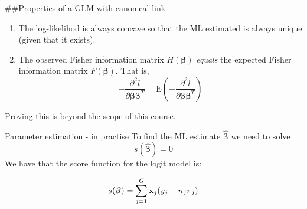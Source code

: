 \documentclass[
  ignorenonframetext,
]{beamer}
\begin{document}
\begin{frame}
\#\#Properties of a GLM with canonical link

\begin{enumerate}
\item
  The log-likelihod is always concave so that the ML estimated is always
  unique (given that it exists).
\item
  The observed Fisher information matrix \(H(\boldsymbol{\beta})\)
  \emph{equals} the expected Fisher information matrix
  \(F(\boldsymbol{\beta})\). That is,
  \[-\frac{\partial^2 l}{\partial \boldsymbol{\beta} \boldsymbol{\beta}^T}=\text{E}(-\frac{\partial^2 l}{\partial \boldsymbol{\beta} \boldsymbol{\beta}^T})\]
\end{enumerate}

Proving this is beyond the scope of this course.
\end{frame}

\begin{frame}{Parameter estimation - in practise}
\protect\hypertarget{parameter-estimation---in-practise}{}
To find the ML estimate \(\hat{\boldsymbol{\beta}}\) we need to solve
\[s(\hat{\boldsymbol{\beta}})=0\] We have that the score function for
the logit model is:

\[
s(\boldsymbol{\beta})=\sum_{j=1}^G {\bf x}_j (y_j-n_j\pi_j)
\]
\end{frame}

\begin{frame}
\end{frame}
\end{document}
